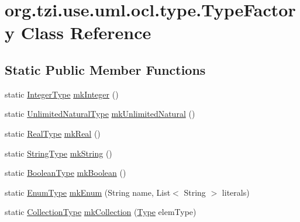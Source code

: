 \hypertarget{classorg_1_1tzi_1_1use_1_1uml_1_1ocl_1_1type_1_1_type_factory}{\section{org.\-tzi.\-use.\-uml.\-ocl.\-type.\-Type\-Factory Class Reference}
\label{classorg_1_1tzi_1_1use_1_1uml_1_1ocl_1_1type_1_1_type_factory}
}
\subsection*{Static Public Member Functions}
\begin{DoxyCompactItemize}
\item 
static \hyperlink{classorg_1_1tzi_1_1use_1_1uml_1_1ocl_1_1type_1_1_integer_type}{Integer\-Type} \hyperlink{classorg_1_1tzi_1_1use_1_1uml_1_1ocl_1_1type_1_1_type_factory_a08caca65f1df0ed1dec174533a614938}{mk\-Integer} ()
\item 
static \hyperlink{classorg_1_1tzi_1_1use_1_1uml_1_1ocl_1_1type_1_1_unlimited_natural_type}{Unlimited\-Natural\-Type} \hyperlink{classorg_1_1tzi_1_1use_1_1uml_1_1ocl_1_1type_1_1_type_factory_aef1dc822077c57fc0be96ed66f3adffb}{mk\-Unlimited\-Natural} ()
\item 
static \hyperlink{classorg_1_1tzi_1_1use_1_1uml_1_1ocl_1_1type_1_1_real_type}{Real\-Type} \hyperlink{classorg_1_1tzi_1_1use_1_1uml_1_1ocl_1_1type_1_1_type_factory_aab107f5e1fbcebdf668072a3ec11d2dc}{mk\-Real} ()
\item 
static \hyperlink{classorg_1_1tzi_1_1use_1_1uml_1_1ocl_1_1type_1_1_string_type}{String\-Type} \hyperlink{classorg_1_1tzi_1_1use_1_1uml_1_1ocl_1_1type_1_1_type_factory_a272cefba333e86ba4ed7cddd28de1d41}{mk\-String} ()
\item 
static \hyperlink{classorg_1_1tzi_1_1use_1_1uml_1_1ocl_1_1type_1_1_boolean_type}{Boolean\-Type} \hyperlink{classorg_1_1tzi_1_1use_1_1uml_1_1ocl_1_1type_1_1_type_factory_affa7763b1b39288c3d0d9657aadae3ac}{mk\-Boolean} ()
\item 
static \hyperlink{classorg_1_1tzi_1_1use_1_1uml_1_1ocl_1_1type_1_1_enum_type}{Enum\-Type} \hyperlink{classorg_1_1tzi_1_1use_1_1uml_1_1ocl_1_1type_1_1_type_factory_aabe6c763fddeffff4554b9ff6004e88f}{mk\-Enum} (String name, List$<$ String $>$ literals)
\item 
static \hyperlink{classorg_1_1tzi_1_1use_1_1uml_1_1ocl_1_1type_1_1_collection_type}{Collection\-Type} \hyperlink{classorg_1_1tzi_1_1use_1_1uml_1_1ocl_1_1type_1_1_type_factory_a9cc13112b96cbd9138ff30e31ae440d2}{mk\-Collection} (\hyperlink{interfaceorg_1_1tzi_1_1use_1_1uml_1_1ocl_1_1type_1_1_type}{Type} elem\-Type)

\end{DoxyCompactItemize}

